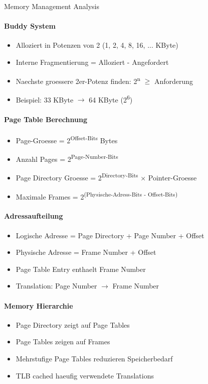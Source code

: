 \begin{KR}{Memory Management Analysis}
    \paragraph{Buddy System}
    \begin{itemize}
        \item Alloziert in Potenzen von 2 (1, 2, 4, 8, 16, ... KByte)
        \item Interne Fragmentierung = Alloziert - Angefordert
        \item Naechste groessere 2er-Potenz finden: 2\textsuperscript{n} $\geq$ Anforderung
        \item Beispiel: 33 KByte $\rightarrow$ 64 KByte (2\textsuperscript{6})
    \end{itemize}
    
    \paragraph{Page Table Berechnung}
    \begin{itemize}
        \item Page-Groesse = 2\textsuperscript{Offset-Bits} Bytes
        \item Anzahl Pages = 2\textsuperscript{Page-Number-Bits}
        \item Page Directory Groesse = 2\textsuperscript{Directory-Bits} × Pointer-Groesse
        \item Maximale Frames = 2\textsuperscript{(Physische-Adress-Bits - Offset-Bits)}
    \end{itemize}
    
    \paragraph{Adressaufteilung}
    \begin{itemize}
        \item Logische Adresse = Page Directory + Page Number + Offset
        \item Physische Adresse = Frame Number + Offset
        \item Page Table Entry enthaelt Frame Number
        \item Translation: Page Number $\rightarrow$ Frame Number
    \end{itemize}
    
    \paragraph{Memory Hierarchie}
    \begin{itemize}
        \item Page Directory zeigt auf Page Tables
        \item Page Tables zeigen auf Frames
        \item Mehrstufige Page Tables reduzieren Speicherbedarf
        \item TLB cached haeufig verwendete Translations
    \end{itemize}
\end{KR}


